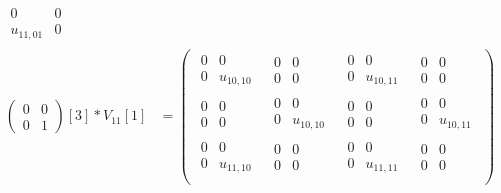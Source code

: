 \documentclass{exam} %
\theoremstyle{plain}
\theoremstyle{definition}
\theoremstyle{remark}
\newcommand{\pmat}[1]{ \begin{pmatrix} #1 \end{pmatrix} }
\numberwithin{equation}{section}  %
\begin{document}
\begin{questions}
\begin{parts}
\begin{solution}
\begin{align*}
{          \begin{smallmatrix} 0&0\\ u_{11,01}&0\end{smallmatrix}
        }\\
        \pmat{0&0\\0&1}[3]*V_{11}[1] &= 
      \pmat{
        \begin{smallmatrix} 0&0\\ 0&u_{10,10} \end{smallmatrix}&
        \begin{smallmatrix} 0&0\\ 0&0 \end{smallmatrix}&
        \begin{smallmatrix} 0&0\\ 0&u_{10,11} \end{smallmatrix}&
        \begin{smallmatrix} 0&0\\ 0&0 \end{smallmatrix}\\
        \begin{smallmatrix} 0&0\\ 0&0 \end{smallmatrix}&
        \begin{smallmatrix} 0&0\\ 0&u_{10,10} \end{smallmatrix}&
        \begin{smallmatrix} 0&0\\ 0&0 \end{smallmatrix}&
        \begin{smallmatrix} 0&0\\ 0&u_{10,11} \end{smallmatrix}\\
        \begin{smallmatrix} 0&0\\ 0&u_{11,10} \end{smallmatrix}&
        \begin{smallmatrix} 0&0\\ 0&0 \end{smallmatrix}&
        \begin{smallmatrix} 0&0\\ 0&u_{11,11} \end{smallmatrix}&
        \begin{smallmatrix} 0&0\\ 0&0 \end{smallmatrix}\\
}
\end{align*}
\end{solution}
\end{parts}
\end{questions}
\end{document}
